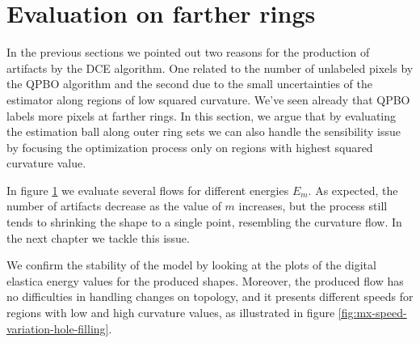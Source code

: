 {\section{Evaluation on farther rings}

In the previous sections we pointed out two reasons for the production of artifacts by the DCE algorithm. One related to the number of unlabeled pixels by the QPBO algorithm and the second due to the small uncertainties of the estimator along regions of low squared curvature. We've seen already that QPBO labels more pixels at farther rings. In this section, we argue that by evaluating the estimation ball along outer
ring sets we can also handle the sensibility issue by focusing the optimization process only on regions with highest squared curvature value.

In figure \ref{} we evaluate several flows for different energies $E_m$. As expected, the number of artifacts decrease as the value of $m$ increases, but the process still tends to shrinking the shape to a single point, resembling the curvature flow. In the next chapter we tackle this issue.

We confirm the stability of the model by looking at the plots of the digital elastica energy values for the produced shapes. Moreover, the produced flow has no difficulties in handling changes on topology, and it presents different speeds for regions with low and high curvature values, as illustrated in figure \ref{fig:mx-speed-variation-hole-filling}.


}

